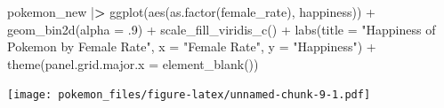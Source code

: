 \documentclass[
]{article}
\newenvironment{Shaded}{\begin{snugshade}}{\end{snugshade}}
\newcommand{\AttributeTok}[1]{\textcolor[rgb]{0.77,0.63,0.00}{#1}}
\newcommand{\DecValTok}[1]{\textcolor[rgb]{0.00,0.00,0.81}{#1}}
\newcommand{\ErrorTok}[1]{\textcolor[rgb]{0.64,0.00,0.00}{\textbf{#1}}}
\newcommand{\FunctionTok}[1]{\textcolor[rgb]{0.00,0.00,0.00}{#1}}
\newcommand{\NormalTok}[1]{#1}
\newcommand{\SpecialCharTok}[1]{\textcolor[rgb]{0.00,0.00,0.00}{#1}}
\newcommand{\StringTok}[1]{\textcolor[rgb]{0.31,0.60,0.02}{#1}}
\begin{document}
\begin{Shaded}
\begin{Highlighting}[]
\NormalTok{pokemon\_new }\SpecialCharTok{|}\ErrorTok{\textgreater{}} \FunctionTok{ggplot}\NormalTok{(}\FunctionTok{aes}\NormalTok{(}\FunctionTok{as.factor}\NormalTok{(female\_rate), happiness)) }\SpecialCharTok{+}
  \FunctionTok{geom\_bin2d}\NormalTok{(}\AttributeTok{alpha =}\NormalTok{ .}\DecValTok{9}\NormalTok{) }\SpecialCharTok{+}
  \FunctionTok{scale\_fill\_viridis\_c}\NormalTok{() }\SpecialCharTok{+}
  \FunctionTok{labs}\NormalTok{(}\AttributeTok{title =} \StringTok{"Happiness of Pokemon by Female Rate"}\NormalTok{, }\AttributeTok{x =} \StringTok{"Female Rate"}\NormalTok{, }\AttributeTok{y =} \StringTok{"Happiness"}\NormalTok{) }\SpecialCharTok{+}
  \FunctionTok{theme}\NormalTok{(}\AttributeTok{panel.grid.major.x =} \FunctionTok{element\_blank}\NormalTok{())}
\end{Highlighting}
\end{Shaded}

\texttt{[image: pokemon\_files/figure-latex/unnamed-chunk-9-1.pdf]}
\end{document}
